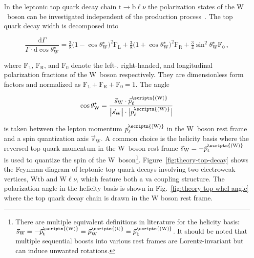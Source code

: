 In the leptonic top quark decay chain $\mathrm{t}\to\mathrm{b}\ell\nu$ the polarization states of the $\mathrm{W}$~boson can be investigated independent of the production process~\cite{AguilarSaavedra:2010nx}. The top quark decay width is decomposed into

\begin{equation}
\frac{\mathrm{d}\Gamma}{\Gamma\cdot\mathrm{d}\cos\theta^\star_\mathrm{W}}=\tfrac{3}{8}\big(1-\cos\theta^\star_\mathrm{W}\big)^{2}\mathrm{F}_\mathrm{L}+\tfrac{3}{8}\big(1+\cos\theta^\star_\mathrm{W}\big)^{2}\mathrm{F}_\mathrm{R}+\tfrac{3}{4}\sin^{2}\theta^\star_\mathrm{W}\mathrm{F}_{0}\,, \label{eq:theory-diff-whel-fractions}
\end{equation}

where $\mathrm{F}_\mathrm{L}$, $\mathrm{F}_\mathrm{R}$, and $\mathrm{F}_{0}$ denote the left-, right-handed, and longitudinal polarization fractions of the W~boson respectively. They are dimensionless form factors and normalized as $\mathrm{F}_\mathrm{L}+\mathrm{F}_\mathrm{R}+\mathrm{F}_{0}=1$. The angle 

\begin{equation}
\cos\theta^\star_\mathrm{W}=\frac{\vec{s}_\mathrm{W}\cdot\vec{p}_{\ell}^\scriptn{\mathrm{(W)}}}{\big|\vec{s}_\mathrm{W}\big|\cdot\big|\vec{p}_{\ell}^\scriptn{\mathrm{(W)}}\big|}
\end{equation}

is taken between the lepton momentum $\vec{p}_{\ell}^\scriptn{\mathrm{(W)}}$ in the W~boson rest frame and a spin quantization axis $\vec{s}_\mathrm{W}$. A common choice is the helicity basis where the reversed top quark momentum in the W~boson rest frame $\vec{s}_\mathrm{W}=-\vec{p}_\mathrm{t}^\scriptn{\mathrm{(W)}}$ is used to quantize the spin of the W~boson\footnote{There are multiple equivalent definitions in literature for the helicity basis: $\vec{s}_\mathrm{W}=-\vec{p}_\mathrm{t}^\scriptn{\mathrm{(W)}}=\vec{p}_\mathrm{W}^\scriptn{\mathrm{(t)}}=\vec{p}_\mathrm{b}^\scriptn{\mathrm{(W)}}$. It should be noted that multiple sequential boosts into various rest frames are Lorentz-invariant but can induce unwanted rotations.}. Figure~\ref{fig:theory-top-decay} shows the Feynman diagram of leptonic top quark decays involving two electroweak vertices, $\mathrm{Wtb}$ and $\mathrm{W}\ell\nu$, which feature both a \gls{va} coupling structure. The polarization angle in the helicity basis is shown in Fig.~\ref{fig:theory-top-whel-angle} where the top quark decay chain is drawn in the W boson rest frame.

